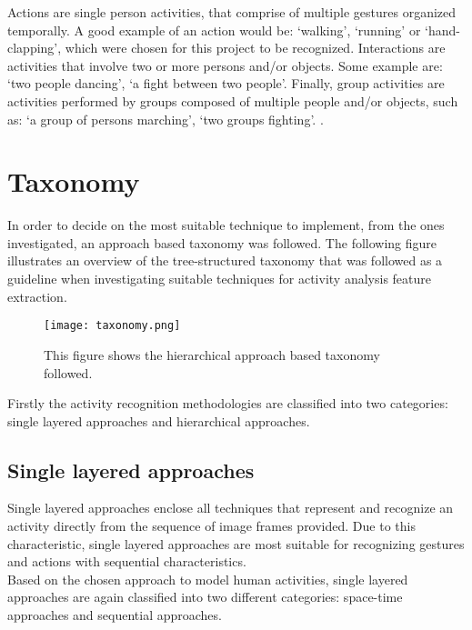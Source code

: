 \documentclass[11pt]{report}
\begin{document}
Actions are single person activities, that comprise of multiple gestures organized temporally. A good example of an action would be: ‘walking’, ‘running’ or ‘hand-clapping’, which were chosen for this project to be recognized. Interactions are activities that involve two or more persons and/or objects. Some example are: ‘two people dancing’, ‘a fight between two people’. Finally, group activities are activities performed by groups composed of multiple people and/or objects, such as: ‘a group of persons marching’, ‘two groups fighting’. \cite{taxonomy}. \\

\section{Taxonomy}
In order to decide on the most suitable technique to implement, from the ones investigated, an approach based taxonomy was followed. The following figure illustrates an overview of the tree-structured taxonomy that was followed as a guideline when investigating suitable techniques for activity analysis feature extraction. \\

\begin{figure}
    \centering
    \texttt{[image: taxonomy.png]}
    \caption{This figure shows the  hierarchical approach based taxonomy followed.}
    \label{fig:taxonomy}
\end{figure}

Firstly the activity recognition methodologies are classified into two categories: single layered approaches and hierarchical approaches. \\

\subsection{Single layered approaches}

Single layered approaches enclose all techniques that represent and recognize an activity directly from the sequence of image frames provided. Due to this characteristic, single layered approaches are most suitable for recognizing gestures and actions with sequential characteristics. \\
Based on the chosen approach to model human activities, single layered approaches are again classified into two different categories: space-time approaches and sequential approaches. \\
\end{document}
